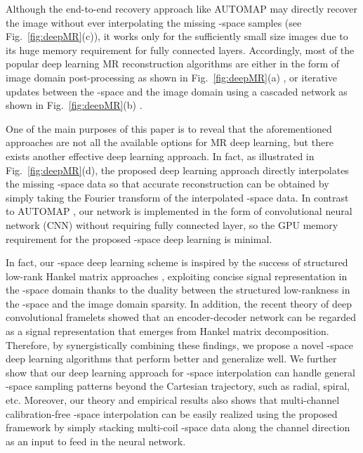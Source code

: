 \documentclass[10pt,journal]{IEEEtran}
\newcommand{\0}{{\boldsymbol{0}}}
\begin{document}
Although the  end-to-end recovery approach like AUTOMAP \cite{zhu2018image} may directly recover the image without ever interpolating the missing -space samples (see Fig.~\ref{fig:deepMR}(c)),
it works only for the sufficiently small size images due to its huge memory requirement for fully connected layers.
Accordingly, most of the popular deep learning MR reconstruction algorithms
are either in the form of  image domain post-processing as shown in Fig.~\ref{fig:deepMR}(a) \cite{lee2018deep,han2017deep}, or iterative updates between the -space and the image domain using a cascaded network as shown in Fig.~\ref{fig:deepMR}(b) \cite{hammernik2018learning,wang2016accelerating,schlemper2018deep,aggarwal2019modl}.



One of the main purposes of this paper is  to reveal that the aforementioned approaches are not all the available options for MR deep learning, but there exists 
another  effective
deep learning approach.
In fact, as illustrated in Fig.~\ref{fig:deepMR}(d),
the proposed deep learning approach directly interpolates the missing -space data so that accurate reconstruction can be obtained by simply taking
the Fourier transform of the interpolated -space data.
In contrast to AUTOMAP  \cite{zhu2018image},  our network is implemented in the form of convolutional neural network (CNN) 
without requiring fully connected layer, so the GPU memory requirement for the proposed
-space deep learning is minimal.


In fact,  our -space deep learning scheme is inspired by the success of structured low-rank Hankel matrix approaches \cite{shin2014calibrationless,haldar2014low,jin2016general,ongie2016off,ye2016compressive},
exploiting  concise signal representation in the -space domain   thanks to the duality between
the structured low-rankness in the -space  and the image domain sparsity.
In addition, the recent theory of deep convolutional framelets \cite{ye2017deep} showed that
an encoder-decoder network can be regarded as a signal representation that emerges from  Hankel matrix decomposition.
Therefore,  by synergistically combining these findings, we  propose
a novel  -space deep learning algorithms that  perform better and generalize well.
We further show that our deep learning approach for
 -space interpolation can handle general -space sampling patterns beyond the Cartesian trajectory, such as radial, spiral, etc. 
Moreover, our theory and empirical results  also shows that
multi-channel calibration-free -space interpolation can be easily realized using the
proposed framework by simply stacking multi-coil -space data along the channel direction as an input to feed in the neural
network.
\end{document}
